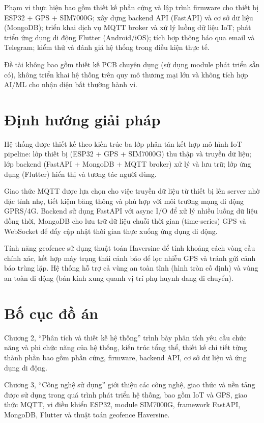 \documentclass[../DoAn.tex]{subfiles}
\begin{document}
Phạm vi thực hiện bao gồm thiết kế phần cứng và lập trình firmware cho thiết bị ESP32 + GPS + SIM7000G; xây dựng backend API (FastAPI) và cơ sở dữ liệu (MongoDB); triển khai dịch vụ MQTT broker và xử lý luồng dữ liệu IoT; phát triển ứng dụng di động Flutter (Android/iOS); tích hợp thông báo qua email và Telegram; kiểm thử và đánh giá hệ thống trong điều kiện thực tế.

Đề tài không bao gồm thiết kế PCB chuyên dụng (sử dụng module phát triển sẵn có), không triển khai hệ thống trên quy mô thương mại lớn và không tích hợp AI/ML cho nhận diện bất thường hành vi.

\section{Định hướng giải pháp}

Hệ thống được thiết kế theo kiến trúc ba lớp phân tán kết hợp mô hình IoT pipeline: lớp thiết bị (ESP32 + GPS + SIM7000G) thu thập và truyền dữ liệu; lớp backend (FastAPI + MongoDB + MQTT broker) xử lý và lưu trữ; lớp ứng dụng (Flutter) hiển thị và tương tác người dùng.

Giao thức MQTT được lựa chọn cho việc truyền dữ liệu từ thiết bị lên server nhờ đặc tính nhẹ, tiết kiệm băng thông và phù hợp với môi trường mạng di động GPRS/4G. Backend sử dụng FastAPI với async I/O để xử lý nhiều luồng dữ liệu đồng thời, MongoDB cho lưu trữ dữ liệu chuỗi thời gian (time-series) GPS và WebSocket để đẩy cập nhật thời gian thực xuống ứng dụng di động.

Tính năng geofence sử dụng thuật toán Haversine để tính khoảng cách vòng cầu chính xác, kết hợp máy trạng thái cảnh báo để lọc nhiễu GPS và tránh gửi cảnh báo trùng lặp. Hệ thống hỗ trợ cả vùng an toàn tĩnh (hình tròn cố định) và vùng an toàn di động (bán kính xung quanh vị trí phụ huynh đang di chuyển).

\section{Bố cục đồ án}

Chương 2, ``Phân tích và thiết kế hệ thống'' trình bày phân tích yêu cầu chức năng và phi chức năng của hệ thống, kiến trúc tổng thể, thiết kế chi tiết từng thành phần bao gồm phần cứng, firmware, backend API, cơ sở dữ liệu và ứng dụng di động.

Chương 3, ``Công nghệ sử dụng'' giới thiệu các công nghệ, giao thức và nền tảng được sử dụng trong quá trình phát triển hệ thống, bao gồm IoT và GPS, giao thức MQTT, vi điều khiển ESP32, module SIM7000G, framework FastAPI, MongoDB, Flutter và thuật toán geofence Haversine.
\end{document}
